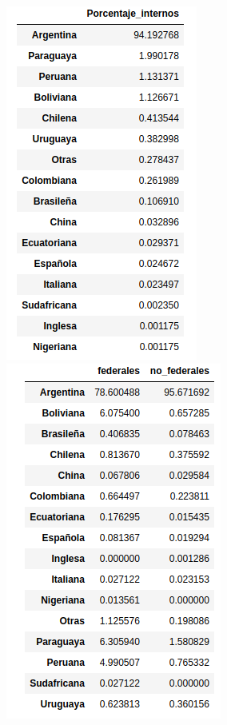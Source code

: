 \documentclass[10pt]{article}
\begin{document}
\begin{figure}[H]
	\centering
	\includegraphics[scale=0.6]{graficos/nacionalidad.png}
	\includegraphics[scale=0.6]{graficos/nacionalidad_tipo_establecimiento.png}
	\caption{}
\end{figure}
\end{document}
